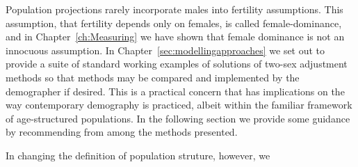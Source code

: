 Population projections rarely incorporate males into fertility assumptions. This
assumption, that fertility depends only on females, is called female-dominance,
and in Chapter~\ref{ch:Measuring} we have shown that female dominance is not an
innocuous assumption. In Chapter~\ref{sec:modellingapproaches} we set out to provide a
suite of standard working examples of solutions of two-sex adjustment methods 
so that methods may be compared and implemented by the demographer if desired.
This is a practical concern that has implications on the way
contemporary demography is practiced, albeit within the familiar framework of
age-structured populations. In the following section we provide some
guidance by recommending from among the methods presented.

In changing the definition of population struture, however, we

